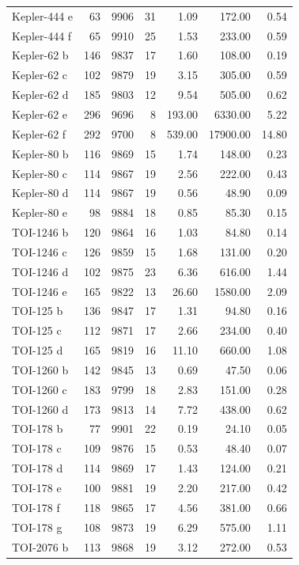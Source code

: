 \begin{table}
\begin{tabular}{lrrrrrr}
Kepler-444 e & 63 & 9906 & 31 & 1.09 & 172.00 & 0.54 \\
Kepler-444 f & 65 & 9910 & 25 & 1.53 & 233.00 & 0.59 \\
Kepler-62 b & 146 & 9837 & 17 & 1.60 & 108.00 & 0.19 \\
Kepler-62 c & 102 & 9879 & 19 & 3.15 & 305.00 & 0.59 \\
Kepler-62 d & 185 & 9803 & 12 & 9.54 & 505.00 & 0.62 \\
Kepler-62 e & 296 & 9696 & 8 & 193.00 & 6330.00 & 5.22 \\
Kepler-62 f & 292 & 9700 & 8 & 539.00 & 17900.00 & 14.80 \\
Kepler-80 b & 116 & 9869 & 15 & 1.74 & 148.00 & 0.23 \\
Kepler-80 c & 114 & 9867 & 19 & 2.56 & 222.00 & 0.43 \\
Kepler-80 d & 114 & 9867 & 19 & 0.56 & 48.90 & 0.09 \\
Kepler-80 e & 98 & 9884 & 18 & 0.85 & 85.30 & 0.15 \\
TOI-1246 b & 120 & 9864 & 16 & 1.03 & 84.80 & 0.14 \\
TOI-1246 c & 126 & 9859 & 15 & 1.68 & 131.00 & 0.20 \\
TOI-1246 d & 102 & 9875 & 23 & 6.36 & 616.00 & 1.44 \\
TOI-1246 e & 165 & 9822 & 13 & 26.60 & 1580.00 & 2.09 \\
TOI-125 b & 136 & 9847 & 17 & 1.31 & 94.80 & 0.16 \\
TOI-125 c & 112 & 9871 & 17 & 2.66 & 234.00 & 0.40 \\
TOI-125 d & 165 & 9819 & 16 & 11.10 & 660.00 & 1.08 \\
TOI-1260 b & 142 & 9845 & 13 & 0.69 & 47.50 & 0.06 \\
TOI-1260 c & 183 & 9799 & 18 & 2.83 & 151.00 & 0.28 \\
TOI-1260 d & 173 & 9813 & 14 & 7.72 & 438.00 & 0.62 \\
TOI-178 b & 77 & 9901 & 22 & 0.19 & 24.10 & 0.05 \\
TOI-178 c & 109 & 9876 & 15 & 0.53 & 48.40 & 0.07 \\
TOI-178 d & 114 & 9869 & 17 & 1.43 & 124.00 & 0.21 \\
TOI-178 e & 100 & 9881 & 19 & 2.20 & 217.00 & 0.42 \\
TOI-178 f & 118 & 9865 & 17 & 4.56 & 381.00 & 0.66 \\
TOI-178 g & 108 & 9873 & 19 & 6.29 & 575.00 & 1.11 \\
TOI-2076 b & 113 & 9868 & 19 & 3.12 & 272.00 & 0.53 \\

\end{tabular}
\end{table}
